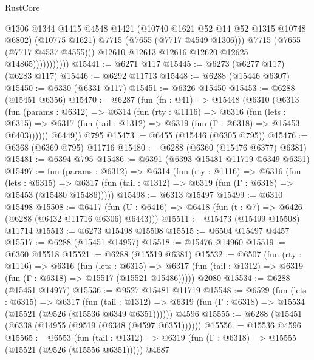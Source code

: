 \begin{lexlean}{RustCore}
\begin{coremodule}
                              @1306
                              @1344
                              @1415
                              @4548
                              @1421
                              (@10740 @1621 @52 @14 @52 @1315 @10748 @6802)
                              (@10775 @1621)
                              @7715
                              (@7655 (@7717 @4549 @1306)))
                            @7715
                            (@7655 (@7717 @4537 @4555)))
                          @12610
                          @12613
                          @12616
                          @12620
                          @12625
                          @14865)))))))))))
@15441 := @6271 @117
@15445 := @6273 (@6277 @117) (@6283 @117)
@15446 := @6292 @11713
@15448 := @6288 (@15446 @6307)
@15450 := @6330 (@6331 @117)
@15451 := @6326 @15450
@15453 := @6288 (@15451 @6356)
@15470 := @6287
    (fun (fn : @41) =>
    @15448
      (@6310
        (@6313
          (fun (params : @6312) =>
          @6314
            (fun (rty : @1116) =>
            @6316
              (fun (lets : @6315) =>
              @6317 (fun (tail : @1312) => @6319 (fun (Γ : @6318) => @15453 @6403))))))
        @6449))
    @795
@15473 := @6455 (@15446 (@6305 @795))
@15476 := @6368 (@6369 @795) @11716
@15480 := @6288 (@6360 (@15476 @6377) @6381)
@15481 := @6394 @795
@15486 := @6391 (@6393 @15481 @11719 @6349 @6351)
@15497 := fun (params : @6312) =>
  @6314
    (fun (rty : @1116) =>
    @6316
      (fun (lets : @6315) =>
      @6317 (fun (tail : @1312) => @6319 (fun (Γ : @6318) => @15453 (@15480 @15486)))))
@15498 := @6313 @15497
@15499 := @6310 @15498
@15508 := @6417
    (fun (U : @6416) => @6418 (fun (t : @7) => @6426 (@6288 (@6432 @11716 @6306) @6443)))
@15511 := @15473 (@15499 @15508) @11714
@15513 := @6273 @15498 @15508
@15515 := @6504 @15497 @4457
@15517 := @6288 (@15451 @14957)
@15518 := @15476 @14960
@15519 := @6360 @15518
@15521 := @6288 (@15519 @6381)
@15532 := @6507
    (fun (rty : @1116) =>
    @6316
      (fun (lets : @6315) =>
      @6317 (fun (tail : @1312) => @6319 (fun (Γ : @6318) => @15517 (@15521 @15486)))))
    @2080
@15534 := @6288 (@15451 @14977)
@15536 := @9527 @15481 @11719
@15548 := @6529
    (fun (lets : @6315) =>
    @6317
      (fun (tail : @1312) =>
      @6319 (fun (Γ : @6318) => @15534 (@15521 (@9526 (@15536 @6349 @6351))))))
    @4596
@15555 := @6288 (@15451 (@6338 (@14955 (@9519 (@6348 (@4597 @6351))))))
@15556 := @15536 @4596
@15565 := @6553
    (fun (tail : @1312) => @6319 (fun (Γ : @6318) => @15555 (@15521 (@9526 (@15556 @6351)))))
    @4687

\end{coremodule}
\end{lexlean}
